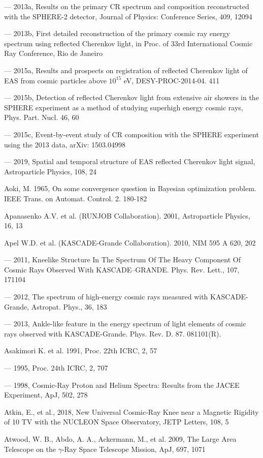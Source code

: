 --- 2013a, Results on the primary CR spectrum and composition reconstructed with the SPHERE-2 detector, Journal of Physics: Conference Series, 409, 12094

--- 2013b, First detailed reconstruction of the primary cosmic ray energy spectrum using reflected Cherenkov light, in Proc. of 33rd International Cosmic Ray Conference, Rio de Janeiro

--- 2015a, Results and prospects on registration of reflected Cherenkov light of EAS from cosmic particles above $10^{15}$ eV, DESY-PROC-2014-04. 411

--- 2015b, Detection of reflected Cherenkov light from extensive air showers in the SPHERE experiment as a method of studying superhigh energy cosmic rays, Phys. Part. Nucl. 46, 60

--- 2015c, Event-by-event study of CR composition with the SPHERE experiment using the 2013 data, arXiv: 1503.04998

--- 2019, Spatial and temporal structure of EAS reflected Cherenkov light signal, Astroparticle Physics, 108, 24

Aoki, M. 1965, On some convergence question in Bayesian optimization problem. IEEE Trans. on Automat. Control. 2. 180-182

Apanasenko A.V. et al. (RUNJOB Collaboration). 2001, Astroparticle Physics, 16, 13 

Apel W.D. et al. (KASCADE-Grande Collaboration). 2010, NIM 595 A 620, 202

--- 2011, Kneelike Structure In The Spectrum Of The Heavy Component Of Cosmic Rays Observed With KASCADE--GRANDE. Phys. Rev. Lett., 107, 171104

--- 2012, The spectrum of high-energy cosmic rays measured with KASCADE-Grande, Astropat. Phys., 36, 183

--- 2013, Ankle-like feature in the energy spectrum of light elements of cosmic rays observed with KASCADE-Grande. Phys. Rev. D. 87. 081101(R).

Asakimori K. et al. 1991, Proc. 22th ICRC, 2, 57

--- 1995, Proc. 24th ICRC, 2, 707

--- 1998, Cosmic-Ray Proton and Helium Spectra: Results from the JACEE Experiment, ApJ, 502, 278

Atkin, E., et al., 2018, New Universal Cosmic-Ray Knee near a Magnetic Rigidity of 10 TV with the NUCLEON Space Observatory, JETP Letters, 108, 5

Atwood, W. B., Abdo, A. A., Ackermann, M., et al. 2009, The Large Area Telescope on the \fermi{} $\gamma$-Ray Space Telescope Mission, ApJ, 697, 1071

